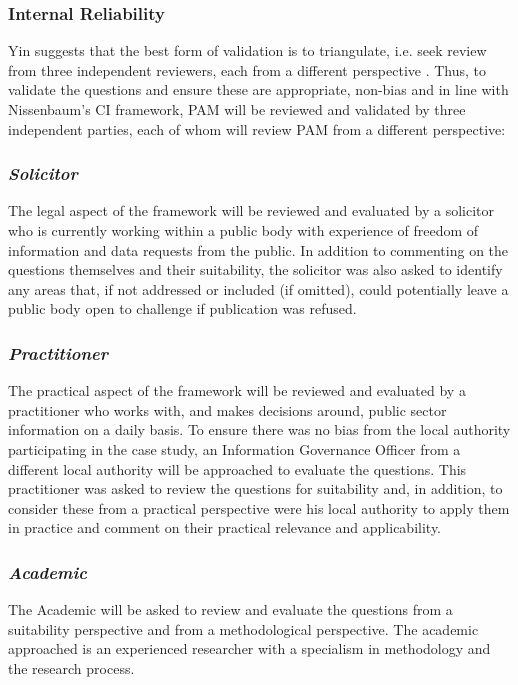 \subsubsection{Internal Reliability}
Yin suggests that the best form of validation is to triangulate, i.e. seek review from three independent reviewers, each from a different perspective  \cite{Yin_CS_Design2013}. Thus, to validate the questions and ensure these are appropriate, non-bias and in line with Nissenbaum's CI framework, PAM will be reviewed and validated by three independent parties, each of whom will review PAM from a different perspective:
 
\subsubsection{\it Solicitor}

The legal aspect of the framework will be reviewed and evaluated by a solicitor who is currently working within a public body with experience of freedom of information and data requests from the public. In addition to commenting on the questions themselves and their suitability, the solicitor was also asked to identify any areas that, if not addressed or included (if omitted), could potentially leave a public body open to challenge if publication was refused.

\subsubsection{\it Practitioner}

The practical aspect of the framework will be reviewed and evaluated by a practitioner who works with, and makes decisions around, public sector information on a daily basis. To ensure there was no bias from the local authority participating in the case study, an Information Governance Officer from a different local authority will be approached to evaluate the questions. This practitioner was asked to review the questions for suitability and, in addition, to consider these from a practical perspective were his local authority to apply them in practice and comment on their practical relevance and applicability.

\subsubsection{\it Academic}

The Academic will be asked to review and evaluate the questions from a suitability perspective and from a methodological perspective. The academic approached is an experienced researcher with a specialism in methodology and the research process.

